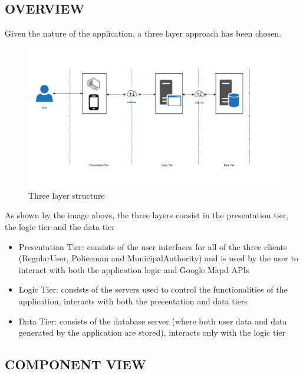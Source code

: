 \subsection{OVERVIEW}
Given the nature of the application, a three layer approach has been chosen.\newline
\begin{figure}[h!]
	\centering
	\includegraphics[width=\textwidth]{Images/three_layer}
	\caption{Three layer structure}
\end{figure}
\newline
As shown by the image above, the three layers consist in the presentation tier, the logic tier and the data tier
\begin{itemize}
\item Presentation Tier: consists of the user interfaces for all of the three clients (RegularUser, Policeman and MunicipalAuthority) and is used by the user to interact with both the application logic and Google Mapd APIs \newline
\item Logic Tier: consists of the servers used to control the functionalities of the application, interacts with both the presentation and data tiers \newline
\item Data Tier: consists of the database server (where both user data and data generated by the application are stored), interacts only with the logic tier \newline
\end{itemize}
\newpage
\subsection{COMPONENT VIEW}
